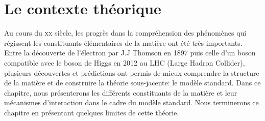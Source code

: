 \newcommand{\siecle}[1]{\textsc{#1}\ieme}
\chapter{Le contexte théorique}
\label{chap.ms}
Au cours du \siecle{xx} siècle, les progrès dans la compréhension des phénomènes qui régissent les constituants élémentaires de la matière ont été très importants. Entre la découverte de l'électron par J.J Thomson en 1897 puis celle d'un boson compatible avec le boson de Higgs en 2012 au LHC (Large Hadron Collider), plusieurs découvertes et prédictions ont permis de mieux comprendre la structure de la matière et de construire la théorie sous-jacente: le modèle standard. Dans ce chapitre, nous présenterons les différents constituants de la matière et leur mécanismes d'interaction dans le cadre du modèle standard. Nous terminerons ce chapitre en présentant quelques limites de cette théorie.
\minitoc
\newpage


